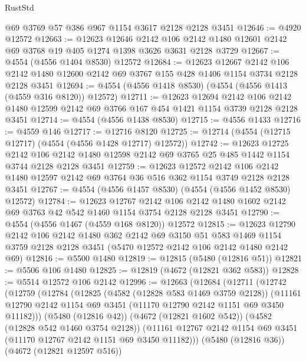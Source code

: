 \begin{lexlean}{RustStd}
\begin{coremodule}
    @69
    @3769
    @57
    @386
    @967
    @1154
    @3617
    @2128
    @2128
    @3451
@12646 := @4920 @12572
@12663 := @12623
    @12646
    @2142
    @106
    @2142
    @1480
    @12601
    @2142
    @69
    @3768
    @19
    @405
    @1274
    @1398
    @3626
    @3631
    @2128
    @3729
@12667 := @4554 (@4556 @1404 @8530) @12572
@12684 := @12623
    @12667
    @2142
    @106
    @2142
    @1480
    @12600
    @2142
    @69
    @3767
    @155
    @428
    @1406
    @1154
    @3734
    @2128
    @2128
    @3451
@12694 := @4554 (@4556 @1418 @8530) (@4554 (@4556 @1413 (@4559 @316 @8120)) @12572)
@12711 := @12623
    @12694
    @2142
    @106
    @2142
    @1480
    @12599
    @2142
    @69
    @3766
    @167
    @454
    @1421
    @1154
    @3739
    @2128
    @2128
    @3451
@12714 := @4554 (@4556 @1438 @8530)
@12715 := @4556 @1433
@12716 := @4559 @146
@12717 := @12716 @8120
@12725 := @12714 (@4554 (@12715 @12717) (@4554 (@4556 @1428 @12717) @12572))
@12742 := @12623
    @12725
    @2142
    @106
    @2142
    @1480
    @12598
    @2142
    @69
    @3765
    @25
    @485
    @1442
    @1154
    @3744
    @2128
    @2128
    @3451
@12759 := @12623
    @12572
    @2142
    @106
    @2142
    @1480
    @12597
    @2142
    @69
    @3764
    @36
    @516
    @362
    @1154
    @3749
    @2128
    @2128
    @3451
@12767 := @4554 (@4556 @1457 @8530) (@4554 (@4556 @1452 @8530) @12572)
@12784 := @12623
    @12767
    @2142
    @106
    @2142
    @1480
    @1602
    @2142
    @69
    @3763
    @42
    @542
    @1460
    @1154
    @3754
    @2128
    @2128
    @3451
@12790 := @4554 (@4556 @1467 (@4559 @168 @8120)) @12572
@12815 := @12623
    @12790
    @2142
    @106
    @2142
    @1480
    @362
    @2142
    @69
    @3150
    @51
    @583
    @1469
    @1154
    @3759
    @2128
    @2128
    @3451
    (@5470 @12572 @2142 @106 @2142 @1480 @2142 @69)
@12816 := @5500 @1480
@12819 := @12815 (@5480 (@12816 @51))
@12821 := @5506 @106 @1480
@12825 := @12819 (@4672 (@12821 @362 @583))
@12828 := @5514 @12572 @106 @2142
@12996 := @12663
    (@12684
      (@12711
        (@12742
          (@12759
            (@12784
              (@12825
                (@4582 (@12828 @583 @1469 @3759 @2128))
                (@11161 @12790 @2142 @1154 @69 @3451 (@11170 @12790 @2142 @1151 @69 @3450 @11182)))
              (@5480 (@12816 @42))
              (@4672 (@12821 @1602 @542))
              (@4582 (@12828 @542 @1460 @3754 @2128))
              (@11161 @12767 @2142 @1154 @69 @3451 (@11170 @12767 @2142 @1151 @69 @3450 @11182)))
            (@5480 (@12816 @36))
            (@4672 (@12821 @12597 @516))

\end{coremodule}
\end{lexlean}
